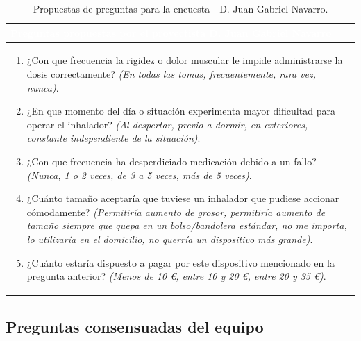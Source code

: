 \documentclass[11pt,a4paper]{article}
\begin{document}
\begin{table}[H]
    \centering
    \small
    \renewcommand{\arraystretch}{1.5}
    \begin{tabularx}{\linewidth}{|X|}
        \hline
        \rowcolor{ArthroNavy}
        \textcolor{white}{\textbf{Preguntas propuestas por el proyectista D. Juan Gabriel Navarro}} \\ \hline
        \vspace{0.1cm}
        \begin{enumerate}[leftmargin=0.8cm, itemsep=0.2cm]
            \item ¿Con que frecuencia la rigidez o dolor muscular le impide administrarse la dosis correctamente? \textit{(En todas las tomas, frecuentemente, rara vez, nunca)}.
            \item ¿En que momento del día o situación experimenta mayor dificultad para operar el inhalador? \textit{(Al despertar, previo a dormir, en exteriores, constante independiente de la situación)}.
            \item ¿Con que frecuencia ha desperdiciado medicación debido a un fallo? \textit{(Nunca, 1 o 2 veces, de 3 a 5 veces, más de 5 veces)}.
            \item ¿Cuánto tamaño aceptaría que tuviese un inhalador que pudiese accionar cómodamente? \textit{(Permitiría aumento de grosor, permitiría aumento de tamaño siempre que quepa en un bolso/bandolera estándar, no me importa, lo utilizaría en el domicilio, no querría un dispositivo más grande)}.
            \item ¿Cuánto estaría dispuesto a pagar por este dispositivo mencionado en la pregunta anterior? \textit{(Menos de 10 €, entre 10 y 20 €, entre 20 y 35 €)}.
        \end{enumerate}
        \vspace{0.1cm} \\ \hline
    \end{tabularx}
    \caption{Propuestas de preguntas para la encuesta - D. Juan Gabriel Navarro.}
    \label{tab:encuesta_juan}
\end{table}

\newpage

\subsection{Preguntas consensuadas del equipo}


\vspace{0.8cm}
\end{document}
